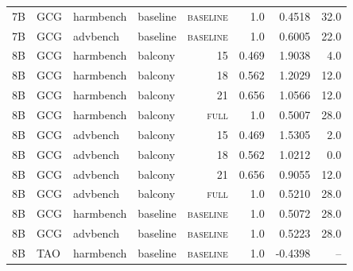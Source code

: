 \begin{tabular}{llllrrrr}
7B & GCG & harmbench & baseline & \textsc{baseline} & 1.0 & 0.4518 & 32.0 \\
7B & GCG & advbench & baseline & \textsc{baseline} & 1.0 & 0.6005 & 22.0 \\
8B & GCG & harmbench & balcony & 15 & 0.469 & 1.9038 & 4.0 \\
8B & GCG & harmbench & balcony & 18 & 0.562 & 1.2029 & 12.0 \\
8B & GCG & harmbench & balcony & 21 & 0.656 & 1.0566 & 12.0 \\
8B & GCG & harmbench & balcony & \textsc{full} & 1.0 & 0.5007 & 28.0 \\
8B & GCG & advbench & balcony & 15 & 0.469 & 1.5305 & 2.0 \\
8B & GCG & advbench & balcony & 18 & 0.562 & 1.0212 & 0.0 \\
8B & GCG & advbench & balcony & 21 & 0.656 & 0.9055 & 12.0 \\
8B & GCG & advbench & balcony & \textsc{full} & 1.0 & 0.5210 & 28.0 \\
8B & GCG & harmbench & baseline & \textsc{baseline} & 1.0 & 0.5072 & 28.0 \\
8B & GCG & advbench & baseline & \textsc{baseline} & 1.0 & 0.5223 & 28.0 \\
8B & TAO & harmbench & baseline & \textsc{baseline} & 1.0 & -0.4398 & -- \\
\bottomrule
\end{tabular}
